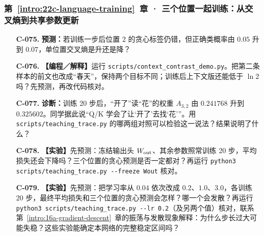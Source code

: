 \subsubsection*{第~\ref*{intro:22c-language-training}~章 · 三个位置一起训练：从交叉熵到共享参数更新}
\begin{enumerate}[label={},leftmargin=4.8em,itemsep=4pt]
\item[\textbf{C-075.}] \leavevmode{}\label{exercise:C-075}\label{exercise:correct-probability-loss}\textbf{预测：}若训练一步后位置 $2$ 的贪心标签仍错，但正确类概率由 $0.05$ 升到 $0.07$，单位置交叉熵是升还是降？
\item[\textbf{C-076.}] \leavevmode{}\label{exercise:C-076}\label{exercise:context-conflicting-labels}\textbf{【编程／解释】}运行 \nolinkurl{scripts/context_contrast_demo.py}。把第二条样本的前文也改成“春天”，保持两个目标不同；训练后上下文版还能低于 $\ln2$ 吗？先预测，再改代码核对。
\item[\textbf{C-077.}] \leavevmode{}\label{exercise:C-077}\label{exercise:attention-attribution}\textbf{诊断：}训练 20 步后，“开了”读“花”的权重 $A_{3,2}$ 由 $0.241768$ 升到 $0.325602$。同学据此说“Q/K 学会了让‘开了’去找‘花’”。用 \texttt{scripts/teaching\_trace.py} 的哪两组对照可以检验这一说法？结果说明了什么？
\item[\textbf{C-078.}] \leavevmode{}\label{exercise:C-078}\label{exercise:frozen-output-head-training}\textbf{【实验】}先预测：冻结输出头 $W_{\rm out}$、其余参数照常训练 20 步，平均损失还会下降吗？三个位置的贪心预测是否一定都对？再运行 \texttt{python3 scripts/teaching\_trace.py -{}-freeze Wout} 核对。
\item[\textbf{C-079.}] \leavevmode{}\label{exercise:C-079}\label{exercise:training-rate-transfer}\textbf{【实验】}先预测：把学习率从 $0.04$ 依次改成 $0.2$、$1.0$、$3.0$，各训练 20 步，最终平均损失和三个位置的贪心预测会怎样？哪一个会发散？再运行 \texttt{python3 scripts/teaching\_trace.py -{}-lr 0.2}（及另两个值）核对，联系第~\ref*{intro:16a-gradient-descent}~章的振荡与发散现象解释：为什么步长过大可能失稳？这些实验能确定本网络的完整稳定区间吗？

\end{enumerate}
